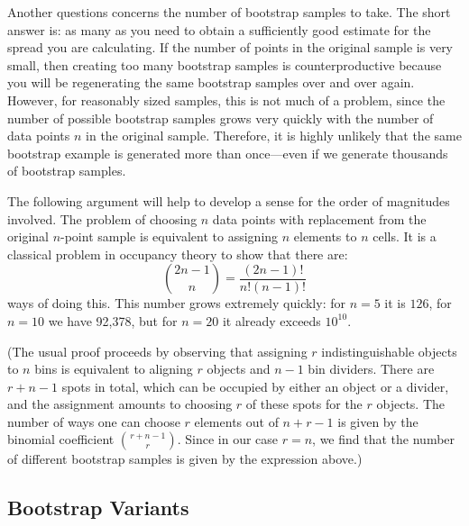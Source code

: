 Another questions concerns the number of bootstrap samples to take.
The short answer is: as many as you need to obtain a sufficiently good
estimate for the spread you are calculating. If the number of points
in the original sample is very small, then creating too many bootstrap
samples is counterproductive because you will be regenerating the same
bootstrap samples over and over again. However, for reasonably sized
samples, this is not much of a problem, since the number of possible
bootstrap samples grows very quickly with the number of data points
$n$ in the original sample.  Therefore, it is highly unlikely that the
same bootstrap example is generated more than once---even if we
generate thousands of bootstrap samples.

The following argument will help to develop a sense for the order of
magnitudes involved.  The problem of choosing $n$ data points with
replacement from the original $n$-point sample is equivalent to
assigning $n$ elements to $n$ cells. It is a classical problem in
occupancy theory to show that there are:
%
\[
\binom{2n - 1}{n} = \frac{(2n - 1)!}{n! (n-1)!}
\]
%
ways of doing this. This number grows extremely quickly: for $n=5$ it
is $126$, for $n=10$ we have 92,378, but for $n=20$ it already exceeds
$10^{10}$.

(The usual proof proceeds by observing that assigning $r$
indistinguishable objects to $n$ bins is equivalent to aligning $r$
objects and $n-1$ bin dividers.\vadjust{\pagebreak}  There are $r+n-1$ spots in total,
which can be occupied by either an object or a divider, and the
assignment amounts to choosing $r$ of these spots for the $r$ objects.
The number of ways one can choose $r$ elements out of $n+r-1$ is given
by the binomial coefficient $\binom{r+n-1}{r}$. Since in our case $r =
n$, we find that the number of different bootstrap samples is given by
the expression above.)

\vspace*{-6pt}
\subsection{Bootstrap Variants}

